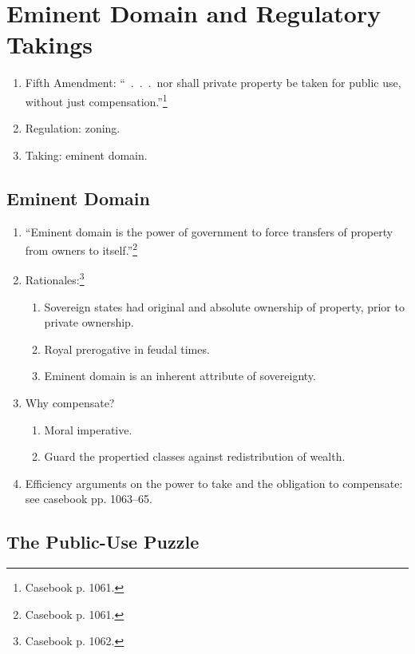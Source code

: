 \section{Eminent Domain and Regulatory Takings}

\begin{enumerate}
    \item Fifth Amendment: ``~.~.~.~nor shall private property be taken for 
    public use, without just compensation.''\footnote{Casebook p. 1061.}
    \item Regulation: zoning.
    \item Taking: eminent domain.
\end{enumerate}

\subsection{Eminent Domain}

\begin{enumerate}
    \item ``Eminent domain is the power of government to force transfers of 
    property from owners to itself.''\footnote{Casebook p. 1061.}
    \item Rationales:\footnote{Casebook p. 1062.}
    \begin{enumerate}
        \item Sovereign states had original and absolute ownership of 
        property, prior to private ownership.
        \item Royal prerogative in feudal times.
        \item Eminent domain is an inherent attribute of sovereignty.
    \end{enumerate}
    \item Why compensate?
    \begin{enumerate}
        \item Moral imperative.
        \item Guard the propertied classes against redistribution of 
        wealth.
    \end{enumerate}
    \item Efficiency arguments on the power to take and the obligation to 
    compensate: see casebook pp. 1063--65.
\end{enumerate}

\subsection{The Public-Use Puzzle}

